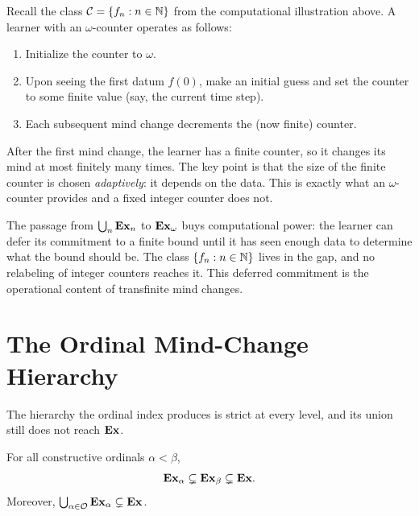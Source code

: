 \begin{example}
\label{ex:omega-learner}
Recall the class $\mathcal{C} = \{f_n : n \in \mathbb{N}\}$ from the
computational illustration above.  A learner with an $\omega$-counter
operates as follows:
\begin{enumerate}[leftmargin=*,itemsep=2pt]
\item Initialize the counter to $\omega$.
\item Upon seeing the first datum $f(0)$, make an initial guess and
  set the counter to some finite value (say, the current time step).
\item Each subsequent mind change decrements the (now finite) counter.
\end{enumerate}
After the first mind change, the learner has a finite counter, so it
changes its mind at most finitely many times.  The key point is
that the size of the finite counter is chosen \emph{adaptively}: it
depends on the data.  This is exactly what an $\omega$-counter provides
and a fixed integer counter does not.
\end{example}

\begin{remark}
\label{rem:ordinal-vs-integer}
The passage from $\bigcup_n \mathbf{Ex}_n$ to $\mathbf{Ex}_\omega$ buys computational
power: the learner can defer its commitment to a finite bound until it
has seen enough data to determine what the bound should be.  The class
$\{f_n : n \in \mathbb{N}\}$ lives in the gap, and no relabeling of integer
counters reaches it.  This deferred commitment is the operational content
of transfinite mind changes.
\end{remark}



\section{The Ordinal Mind-Change Hierarchy}
\label{sec:ordinal-hierarchy}

The hierarchy the ordinal index produces is strict at every level, and
its union still does not reach $\mathbf{Ex}$.

\begin{thm}
\label{thm:ordinal-hierarchy}
For all constructive ordinals $\alpha < \beta$,
\[
  \mathbf{Ex}_\alpha \subsetneq \mathbf{Ex}_\beta \subsetneq \mathbf{Ex}.
\]
Moreover, $\bigcup_{\alpha \in \mathcal{O}} \mathbf{Ex}_\alpha \subsetneq \mathbf{Ex}$.
\end{thm}

